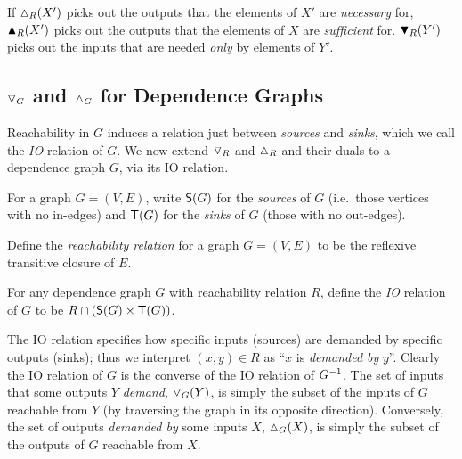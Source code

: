 \noindent If $\demandedByR_R(X')$ picks out the outputs that the elements of $X'$ are \emph{necessary} for,
$\blacktriangle_R(X')$ picks out the outputs that the elements of $X$ are \emph{sufficient} for.
$\blacktriangledown_R(Y')$ picks out the inputs that are needed \emph{only} by elements of $Y'$.


\subsection{$\triangledown_G$ and $\demandedByR_G$ for Dependence Graphs}
\label{sec:conjugate:dependence-graph-functions}


Reachability in $G$ induces a relation just between \emph{sources} and \emph{sinks}, which we call the
\emph{IO} relation of $G$. We now extend $\triangledown_{R}$ and $\demandedByR_{R}$ and their duals to a
dependence graph $G$, via its IO relation.

\begin{definition}
For a graph $G = (V,E)$, write $\mathsf{S}(G)$ for the \emph{sources} of $G$ (i.e.~those vertices with no
in-edges) and $\mathsf{T}(G)$ for the \emph{sinks} of $G$ (those with no out-edges).
\end{definition}

\begin{definition}
Define the \emph{reachability relation} for a graph $G=(V,E)$ to be the reflexive transitive closure of $E$.
\end{definition}

\begin{definition}[IO relation]
For any dependence graph $G$ with reachability relation $R$, define the \emph{IO} relation of $G$ to be $R
\cap (\mathsf{S}(G) \times \mathsf{T}(G))$.
\end{definition}

The IO relation specifies how specific inputs (sources) are demanded by specific outputs (sinks); thus we
interpret $(x, y) \in R$ as ``$x$ is \textit{demanded by} $y$''. Clearly the IO relation of $G$ is the
converse of the IO relation of $G^{-1}$. The set of inputs that some outputs $Y$ \emph{demand},
$\triangledown_{G}(Y)$, is simply the subset of the inputs of $G$ reachable from $Y$ (by traversing the graph in
its opposite direction). Conversely, the set of outputs \emph{demanded by} some inputs $X$,
$\demandedByR_{G}(X)$, is simply the subset of the outputs of $G$ reachable from $X$.

